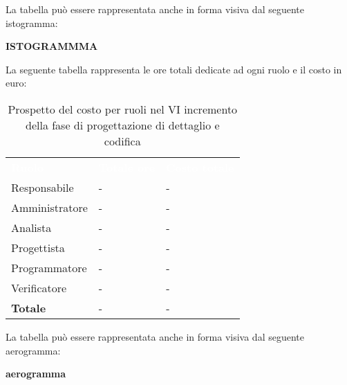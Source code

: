 La tabella può essere rappresentata anche in forma visiva dal seguente istogramma:

\textbf{ISTOGRAMMMA}


La seguente tabella rappresenta le ore totali dedicate ad ogni ruolo e il costo in euro:

\begin{table}[!htbp]
\begin{center}
\renewcommand{\arraystretch}{1.5}
\begin{tabular}{ m{}<{\centering}  m{}<{\centering} m{}<{\centering}}
	\rowcolor{darkblue}
	\textcolor{white}{\textbf{Ruolo}}&\textcolor{white}{\textbf{Totale ore}}&\textcolor{white}{\textbf{Costo totale}}\\ 

	Responsabile  & - & - \\	

	\rowcolor{gray!10} Amministratore & - & - \\
	
	Analista & - & - \\
	
	\rowcolor{gray!10} Progettista & - & - \\
	
	Programmatore & - & - \\
	
	\rowcolor{gray!10} Verificatore & - & - \\
	
	\textbf{Totale} & - & - \\
	
\end{tabular}
\caption{Prospetto del costo per ruoli nel VI incremento della fase di progettazione di dettaglio e codifica}
\end{center}
\end{table}

La tabella può essere rappresentata anche in forma visiva dal seguente aerogramma:

\textbf{aerogramma}


